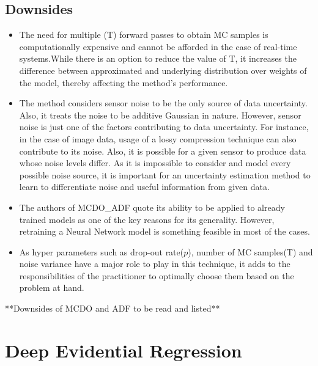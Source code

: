 	\subsection{Downsides}
	\begin{itemize}
		\item The need for multiple (T) forward passes to obtain MC samples is computationally expensive and cannot be afforded in the case of real-time systems.While there is an option to reduce the value of T, it increases the difference between approximated and underlying distribution over weights of the model, thereby affecting the method's performance. 
		\item The method considers sensor noise to be the only source of data uncertainty. Also, it treats the noise to be additive Gaussian in nature. However, sensor noise is just one of the factors contributing to data uncertainty. For instance, in the case of image data, usage of a lossy compression technique can also contribute to its noise. Also, it is possible for a given sensor to produce data whose noise levels differ. As it is impossible to consider and model every possible noise source, it is important for an uncertainty estimation method to learn to differentiate noise and useful information from given data.
		\item The authors of MCDO\_ADF quote its ability to be applied to already trained models as one of the key reasons for its generality. However, retraining a Neural Network model is something feasible in most of the cases.
		\item As hyper parameters such as drop-out rate($p$), number of MC samples(T) and noise variance have a major role to play in this technique, it adds to the responsibilities of the practitioner to optimally choose them based on the problem at hand.
	\end{itemize}    
	**Downsides of MCDO and ADF to be read and listed**\pagebreak
	\section{Deep Evidential Regression}\label{der}
	
